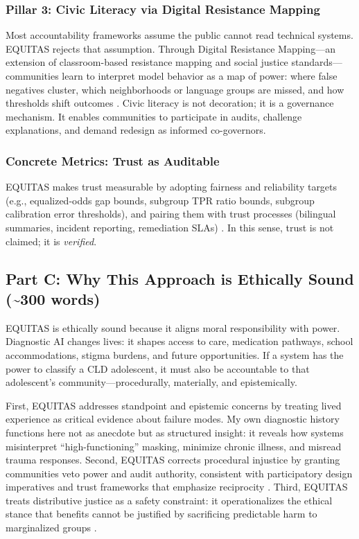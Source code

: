 \subsubsection{Pillar 3: Civic Literacy via Digital Resistance Mapping}
Most accountability frameworks assume the public cannot read technical systems. EQUITAS rejects that assumption. Through Digital Resistance Mapping—an extension of classroom-based resistance mapping and social justice standards—communities learn to interpret model behavior as a map of power: where false negatives cluster, which neighborhoods or language groups are missed, and how thresholds shift outcomes \citep{GarciaBautista2025RMP}. Civic literacy is not decoration; it is a governance mechanism. It enables communities to participate in audits, challenge explanations, and demand redesign as informed co-governors.

\subsubsection{Concrete Metrics: Trust as Auditable}
EQUITAS makes trust measurable by adopting fairness and reliability targets (e.g., equalized-odds gap bounds, subgroup TPR ratio bounds, subgroup calibration error thresholds), and pairing them with trust processes (bilingual summaries, incident reporting, remediation SLAs) \citep{Sagona2025, Chen2023}. In this sense, trust is not claimed; it is \emph{verified}.

\subsection{Part C: Why This Approach is Ethically Sound (\texorpdfstring{\textasciitilde}{~}300 words)}
EQUITAS is ethically sound because it aligns moral responsibility with power. Diagnostic AI changes lives: it shapes access to care, medication pathways, school accommodations, stigma burdens, and future opportunities. If a system has the power to classify a CLD adolescent, it must also be accountable to that adolescent’s community—procedurally, materially, and epistemically.

\vspace{0.5em}
First, EQUITAS addresses standpoint and epistemic concerns by treating lived experience as critical evidence about failure modes. My own diagnostic history functions here not as anecdote but as structured insight: it reveals how systems misinterpret ``high-functioning'' masking, minimize chronic illness, and misread trauma responses. Second, EQUITAS corrects procedural injustice by granting communities veto power and audit authority, consistent with participatory design imperatives \citep{Nadarzynski2024} and trust frameworks that emphasize reciprocity \citep{Sagona2025}. Third, EQUITAS treats distributive justice as a safety constraint: it operationalizes the ethical stance that benefits cannot be justified by sacrificing predictable harm to marginalized groups \citep{Marko2025}.

